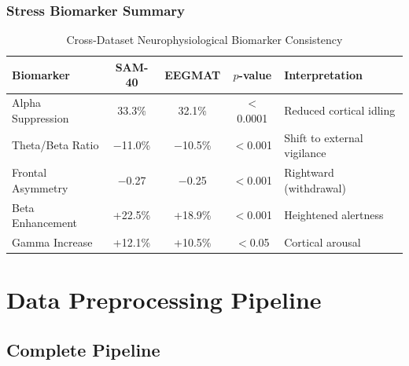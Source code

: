 \documentclass[11pt,a4paper]{article}
\begin{document}
\subsubsection{Stress Biomarker Summary}

\begin{table}[H]
\centering
\caption{Cross-Dataset Neurophysiological Biomarker Consistency}
\small
\begin{tabular}{lcccl}
\toprule
\textbf{Biomarker} & \textbf{SAM-40} & \textbf{EEGMAT} & \textbf{$p$-value} & \textbf{Interpretation} \\
\midrule
Alpha Suppression & 33.3\% & 32.1\% & $<$0.0001 & Reduced cortical idling \\
Theta/Beta Ratio & $-$11.0\% & $-$10.5\% & $<$0.001 & Shift to external vigilance \\
Frontal Asymmetry & $-$0.27 & $-$0.25 & $<$0.001 & Rightward (withdrawal) \\
Beta Enhancement & +22.5\% & +18.9\% & $<$0.001 & Heightened alertness \\
Gamma Increase & +12.1\% & +10.5\% & $<$0.05 & Cortical arousal \\
\bottomrule
\end{tabular}
\end{table}

\section{Data Preprocessing Pipeline}

\subsection{Complete Pipeline}
\end{document}
